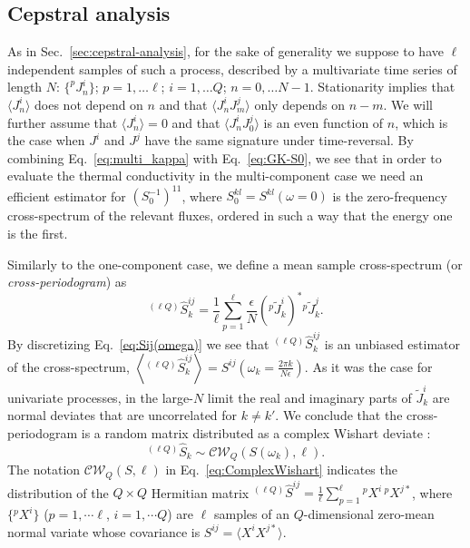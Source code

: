 \subsection{Cepstral analysis}  \label{sec:cepstral-multicomponent}
As in Sec.~\ref{sec:cepstral-analysis}, for the sake of generality we suppose to have $\ell$ independent samples of such a process, described by a multivariate time series of length $N$: $\{ ^{p\!}{J}^i_n \}$; $p=1,\dots \ell$; $i=1,\dots Q$; $n=0,\dots N-1$. Stationarity implies that $\langle {J}^i_n\rangle $ does not depend on $n$ and that $\langle {J}^i_n {J}^j_m \rangle$ only depends on $n-m$. We will further assume that $\langle {J}^i_n\rangle =0 $ and that $\langle {J}^i_n {J}^j_0 \rangle$ is an even function of $n$, which is the case when ${J}^i$ and ${J}^j$ have the same signature under time-reversal. By combining Eq.~\eqref{eq:multi_kappa} with Eq.~\eqref{eq:GK-S0}, we see that in order to evaluate the thermal conductivity in the multi-component case we need an efficient estimator for $\left ( S^{-1}_0\right )^{11}$, where $S^{kl}_0=S^{kl}(\omega=0)$ is the zero-frequency cross-spectrum of the relevant fluxes, ordered in  such a way that the energy one is the first.

Similarly to the one-component case, we define a mean sample cross-spectrum (or \emph{cross-periodogram}) as
\begin{equation}
 ^{(\ell Q)\!}\hat{S}_k^{ij} = \frac{1}{\ell} \sum_{p=1}^{\ell} \frac{\epsilon}{N} \left({}^{p\!}\tilde{J}_k^i\right)^* {}^{p\!}\tilde{J}_k^j .
\end{equation}
By discretizing Eq.~\eqref{eq:Sij(omega)} we see that $^{(\ell Q)\!}\hat{S}_k^{ij}$ is an unbiased estimator of the cross-spectrum, $\left \langle {}^{(\ell Q)\!}\hat{S}_k^{ij} \right \rangle = S^{ij}\left (\omega_k= \frac{2\pi k }{N\epsilon}\right )$. As it was the case for univariate processes, in the large-$N$ limit the real and imaginary parts of $\tilde J^i_k$ are normal deviates that are uncorrelated for $k\ne k'$. We conclude that the cross-periodogram is a random matrix distributed as a complex Wishart deviate \citep{Goodman1963a,Goodman1963b}:
\begin{equation}
  {}^{(\ell Q)\!}\hat{S}_k \sim \mathcal{CW}_Q \left(S(\omega_k), \ell\right). \label{eq:ComplexWishart}
\end{equation}
The notation $\mathcal{CW}_Q \left(S, \ell \right)$ in Eq.~\eqref{eq:ComplexWishart} indicates the distribution of the $Q\times Q$ Hermitian matrix
${}^{(\ell Q)\!}\hat{S}^{ij} = \frac{1}{\ell}\sum_{p=1}^\ell  {}^{p\!}{X}^i \, {}^{p\!}{X}^{j*}$,
where $\{ {}^{p\!}{X}^i \}$ ($p=1,\cdots\ell$, $i=1, \cdots Q$) are $\ell$ samples of an $Q$-dimensional zero-mean normal variate whose covariance is $S^{ij} = \langle X^i X^{j*} \rangle $.

